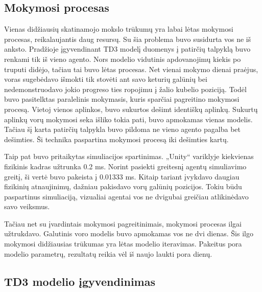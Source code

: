 \documentclass[a4paper, 12pt]{article}
\begin{document}
\subsection{Mokymosi procesas}

Vienas didžiausių skatinamojo mokslo trūkumų yra labai lėtas mokymosi procesas, reikalaujantis daug resursų. Su šia problema buvo susidurta vos ne iš anksto. Pradžioje įgyvendinant TD3 modelį duomenys į patirčių talpyklą buvo renkami tik iš vieno agento. Nors modelio vidutinis apdovanojimų kiekis po truputi didėjo, tačiau tai buvo lėtas procesas. Net vienai mokymo dienai praėjus, voras sugebėdavo išmokti tik stovėti ant savo keturių galūnių bei nedemonstruodavo jokio progreso ties ropojimu į žalio kubelio poziciją. Todėl buvo pasitelktas paralelinis mokymasis, kuris sparčiai pagreitino mokymosi procesą. Vietoj vienos aplinkos, buvo sukurtos dešimt identiškų aplinkų. Sukurtų aplinkų vorų mokymosi seka išliko tokia pati, buvo apmokamas vienas modelis. Tačiau šį karta patirčių talpykla buvo pildoma ne vieno agento pagalba bet dešimties. Ši technika paspartina mokymosi procesą iki dešimties kartų. 

Taip pat buvo pritaikytas simuliacijos spartinimas. „Unity“ variklyje kiekvienas fizikinis kadras užtrunka 0.2 ms. Norint pasiekti greitesnį agentų simuliavimo greitį, ši vertė buvo pakeista į 0.01333 ms. Kitaip tariant įvykdavo daugiau fizikinių atnaujinimų, dažniau pakisdavo vorų galūnių pozicijos. Tokiu būdu paspartinus simuliaciją, vizualiai agentai vos ne dvigubai greičiau atlikinėdavo savo veiksmus. 

Tačiau net su įvardintais mokymosi pagreitinimais, mokymosi procesas ilgai užtrukdavo. Galutinis voro modelis buvo apmokamas vos ne dvi dienas. Šis ilgo mokymosi didžiausias trūkumas yra lėtas modelio iteravimas. Pakeitus pora modelio parametrų, rezultatų reikia vėl iš naujo laukti pora dienų.

\subsection{TD3 modelio įgyvendinimas}
\end{document}
